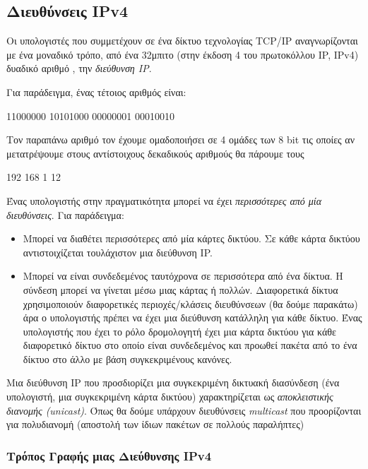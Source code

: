 %
%
\subsection{Διευθύνσεις IPv4}
Οι υπολογιστές που συμμετέχουν σε ένα δίκτυο τεχνολογίας TCP/IP αναγνωρίζονται με ένα μοναδικό τρόπο, από ένα 32μπιτο (στην έκδοση 4 του πρωτοκόλλου IP, IPv4) δυαδικό αριθμό , την \emph{διεύθυνση IP}.

Για παράδειγμα, ένας τέτοιος αριθμός είναι:

11000000 10101000 00000001 00010010

Τον παραπάνω αριθμό τον έχουμε ομαδοποιήσει σε 4 ομάδες των 8 bit τις οποίες αν μετατρέψουμε στους αντίστοιχους δεκαδικούς αριθμούς θα πάρουμε τους

192 168 1 12

\begin{inthebox}
Ένας υπολογιστής στην πραγματικότητα μπορεί να έχει \emph{περισσότερες από μία διευθύνσεις}. Για παράδειγμα:

\begin{itemize}
\item Μπορεί να διαθέτει περισσότερες από μία κάρτες δικτύου. Σε κάθε κάρτα δικτύου αντιστοιχίζεται τουλάχιστον μια διεύθυνση IP.
\item Μπορεί να είναι συνδεδεμένος ταυτόχρονα σε περισσότερα από ένα δίκτυα. Η σύνδεση μπορεί να γίνεται μέσω μιας κάρτας ή πολλών. Διαφορετικά δίκτυα χρησιμοποιούν διαφορετικές περιοχές/κλάσεις διευθύνσεων (θα δούμε παρακάτω) άρα ο υπολογιστής πρέπει να έχει μια διεύθυνση κατάλληλη για κάθε δίκτυο. Ένας υπολογιστής που έχει το ρόλο δρομολογητή έχει μια κάρτα δικτύου για κάθε διαφορετικό δίκτυο στο οποίο είναι συνδεδεμένος και προωθεί πακέτα από το ένα δίκτυο στο άλλο με βάση συγκεκριμένους κανόνες.
\end{itemize}

Μια διεύθυνση IP που προσδιορίζει μια συγκεκριμένη δικτυακή διασύνδεση (ένα υπολογιστή, μια συγκεκριμένη κάρτα δικτύου) χαρακτηρίζεται ως \emph{αποκλειστικής διανομής (unicast)}. Όπως θα δούμε υπάρχουν διευθύνσεις \emph{multicast} που προορίζονται για πολυδιανομή (αποστολή των ίδιων πακέτων σε πολλούς παραλήπτες)\\
\end{inthebox}

\subsubsection*{Τρόπος Γραφής μιας Διεύθυνσης IPv4}

